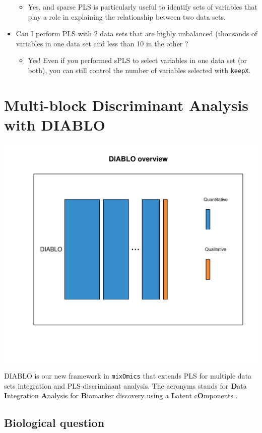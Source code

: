 \documentclass[]{book}
\providecommand{\tightlist}{%
  \setlength{\itemsep}{0pt}\setlength{\parskip}{0pt}}
\begin{document}
\begin{itemize}
  \begin{itemize}
  \tightlist
  \item
    Yes, and sparse PLS is particularly useful to identify sets of variables that play a role in explaining the relationship between two data sets.
  \end{itemize}
\item
  Can I perform PLS with 2 data sets that are highly unbalanced (thousands of variables in one data set and less than 10 in the other ?

  \begin{itemize}
  \tightlist
  \item
    Yes! Even if you performed sPLS to select variables in one data set (or both), you can still control the number of variables selected with \texttt{keepX}.
  \end{itemize}
\end{itemize}

\hypertarget{diablo}{%
\chapter{Multi-block Discriminant Analysis with DIABLO}\label{diablo}}

\begin{center}\includegraphics[width=0.5\linewidth,]{Figures/06-overview-DIABLO-1} \end{center}

DIABLO is our new framework in \texttt{mixOmics} that extends PLS for multiple data sets integration and PLS-discriminant analysis. The acronyms stands for \textbf{D}ata \textbf{I}ntegration \textbf{A}nalysis for \textbf{B}iomarker discovery using a \textbf{L}atent c\textbf{O}mponents \citep{Sin16}.

\hypertarget{biological-question-4}{%
\section{Biological question}\label{biological-question-4}}
\end{document}
